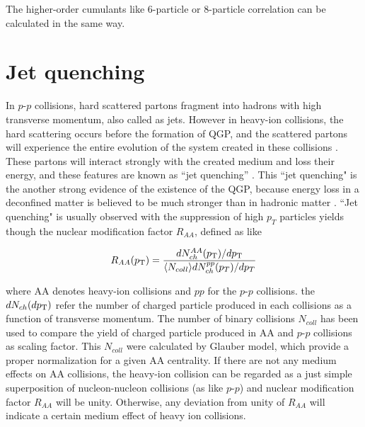 The higher-order cumulants like 6-particle or 8-particle correlation can be calculated in the same way.

\section{Jet quenching}


In $p$-$p$ collisions, hard scattered partons fragment into hadrons with high transverse momentum, also called as jets. However in heavy-ion collisions, the hard scattering occurs before the formation of QGP, and the scattered partons will experience the entire evolution of the system created in these collisions \cite{Enterria:2009am}.
These partons will interact strongly with the created medium and loss their energy, and these features are known as ``jet quenching''  \cite{PhysRevLett.68.1480}. This ``jet quenching" is the another strong evidence of the existence of the QGP, because energy loss in a deconfined matter is believed to be much stronger than in hadronic matter \cite{PhysRevLett.68.1480}. ``Jet quenching" is usually observed with the suppression of high $p_T$ particles yields though the nuclear modification factor $R_{AA}$, defined as like 
 
 \begin{equation}
	R_{AA}(p_{\rm{T}}) = \frac{dN_{ch}^{AA}(p_{\rm{T}})/dp_{\rm{T}}}{\langle N_{coll} \rangle dN_{ch}^{pp}(p_T)/dp_T}
\end{equation}

where AA denotes heavy-ion collisions and $pp$ for the $p$-$p$ collisions. the $dN_{ch}(dp_{\rm{T}})$ refer the number of charged particle produced in each collisions as a function of transverse momentum. The number of binary collisions $N_{coll}$ has been used to compare the yield of charged particle produced in AA and $p$-$p$ collisions as scaling factor. This $N_{coll}$ were calculated by Glauber model, which provide a proper normalization for a given AA centrality. 
  If there are not any medium effects on AA collisions, the heavy-ion collision can be regarded as a just simple superposition of nucleon-nucleon collisions (as like $p$-$p$) and nuclear modification factor $R_{AA}$ will be unity. Otherwise, any deviation from unity of $R_{AA}$  will indicate a certain medium effect of heavy ion collisions. 
  

